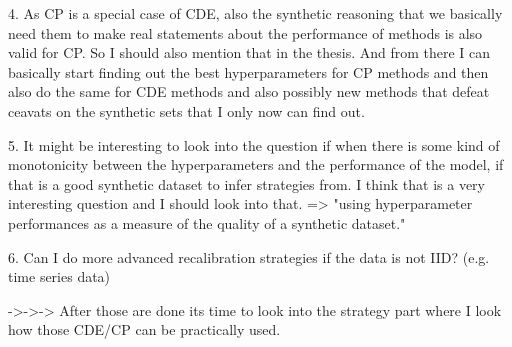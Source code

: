 4. As CP is a special case of CDE, also the synthetic reasoning that we
basically need them to make real statements about the performance of methods is
also valid for CP. So I should also mention that in the thesis. And from there
I can basically start finding out the best hyperparameters for CP methods and
then also do the same for CDE methods and also possibly new methods that defeat
ceavats on the synthetic sets that I only now can find out.

5. It might be interesting to look into the question if when there is some kind
of monotonicity between the hyperparameters and the performance of the model,
if that is a good synthetic dataset to infer strategies from. I think that is a
very interesting question and I should look into that. => "using hyperparameter
performances as a measure of the quality of a synthetic dataset."

6. Can I do more advanced recalibration strategies if the data is not IID?
(e.g. time series data)

->->-> After those are done its time to look into the strategy part where I
look how those CDE/CP can be practically used.